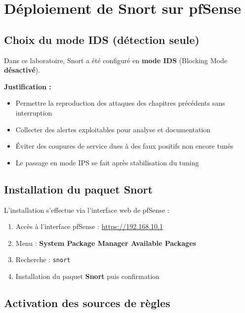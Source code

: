\documentclass[12pt,a4paper,openany]{report}
\begin{document}
\section{Déploiement de Snort sur pfSense}

\subsection{Choix du mode IDS (détection seule)}

\begin{tcolorbox}[colback=primary!5!white, colframe=primary, title=\textbf{Décision de Conception : Mode IDS}]
Dans ce laboratoire, Snort a été configuré en \textbf{mode IDS} (Blocking Mode \textbf{désactivé}).

\textbf{Justification :}
\begin{itemize}
    \item Permettre la reproduction des attaques des chapitres précédents sans interruption
    \item Collecter des alertes exploitables pour analyse et documentation
    \item Éviter des coupures de service dues à des faux positifs non encore tunés
    \item Le passage en mode IPS se fait après stabilisation du tuning
\end{itemize}
\end{tcolorbox}

\subsection{Installation du paquet Snort}

L'installation s'effectue via l'interface web de pfSense :
\begin{enumerate}
    \item Accès à l'interface pfSense : \url{https://192.168.10.1}
    \item Menu : \textbf{System \textrightarrow{} Package Manager \textrightarrow{} Available Packages}
    \item Recherche : \texttt{snort}
    \item Installation du paquet \textbf{Snort} puis confirmation
\end{enumerate}

\subsection{Activation des sources de règles}
\end{document}
